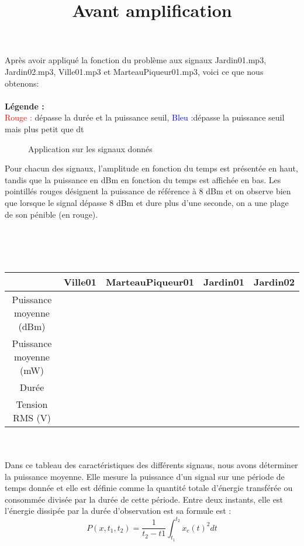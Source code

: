Après avoir appliqué la fonction du problème aux signaux Jardin01.mp3, Jardin02.mp3, Ville01.mp3 et MarteauPiqueur01.mp3, voici ce que nous obtenons:
\\
\\
\textbf{Légende :}
\\
\textcolor{red}{Rouge :} dépasse la durée et la puissance seuil, \textcolor{blue}{Bleu :}dépasse la puissance seuil mais plus petit que dt

\begin{figure}[htb]
\caption{Application sur les signaux donnés}
\label{Fig.main.2}
\end{figure}

Pour chacun des signaux, l'amplitude en fonction du temps est présentée en haut, tandis que la puissance en dBm en fonction du temps est affichée en bas. Les pointillés rouges désignent la puissance de référence à 8 dBm et on observe bien que lorsque le signal dépasse 8 dBm et dure plus d'une seconde, on a une plage de son pénible (en rouge).
\\
\\
\title{Avant amplification}
\\
\\
\begin{tabular}{|c|c|c|c|c|}
  \hline
  & Ville01 & MarteauPiqueur01 & Jardin01 & Jardin02 \\
  \hline
  Puissance moyenne (dBm) & & & & \\
  \hline
  Puissance moyenne (mW) & & & & \\
  \hline
  Durée & & & & \\
  \hline
  Tension RMS (V) & & & & \\
  \hline
\end{tabular}
\\
\\
Dans ce tableau des caractéristiques des différents signaus, nous avons déterminer la puissance moyenne. Elle mesure la puissance d'un signal sur une période de temps donnée et elle est définie comme la quantité totale d'énergie transférée ou consommée divisée par la durée de cette période. Entre deux instants, elle est l'énergie dissipée par la durée d'observation est sa formule est : 
\begin{equation}
    P(x, t_{1}, t_{2}) = \frac{1}{t_{2} - t{1}} \int_{t_{1}}^{t_{2}}x_{c}(t)^2 dt
\end{equation}